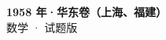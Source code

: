 \documentclass[zihao=-4, a4paper]{ctexart}
\begin{document}
\begin{center}
  {\Large\bfseries 1958 年·华东卷（上海、福建）}\\[4pt]
  {\large 数学 · 试题版}
\end{center}
\medskip
{}

\end{document}
